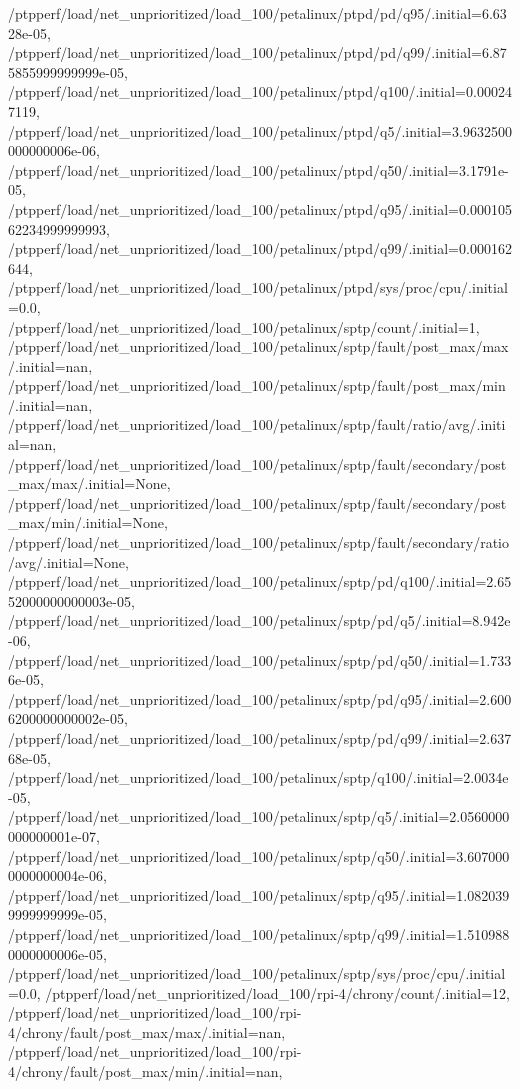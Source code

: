 {    /ptpperf/load/net_unprioritized/load_100/petalinux/ptpd/pd/q95/.initial=6.6328e-05,
    /ptpperf/load/net_unprioritized/load_100/petalinux/ptpd/pd/q99/.initial=6.875855999999999e-05,
    /ptpperf/load/net_unprioritized/load_100/petalinux/ptpd/q100/.initial=0.000247119,
    /ptpperf/load/net_unprioritized/load_100/petalinux/ptpd/q5/.initial=3.9632500000000006e-06,
    /ptpperf/load/net_unprioritized/load_100/petalinux/ptpd/q50/.initial=3.1791e-05,
    /ptpperf/load/net_unprioritized/load_100/petalinux/ptpd/q95/.initial=0.00010562234999999993,
    /ptpperf/load/net_unprioritized/load_100/petalinux/ptpd/q99/.initial=0.000162644,
    /ptpperf/load/net_unprioritized/load_100/petalinux/ptpd/sys/proc/cpu/.initial=0.0,
    /ptpperf/load/net_unprioritized/load_100/petalinux/sptp/count/.initial=1,
    /ptpperf/load/net_unprioritized/load_100/petalinux/sptp/fault/post_max/max/.initial=nan,
    /ptpperf/load/net_unprioritized/load_100/petalinux/sptp/fault/post_max/min/.initial=nan,
    /ptpperf/load/net_unprioritized/load_100/petalinux/sptp/fault/ratio/avg/.initial=nan,
    /ptpperf/load/net_unprioritized/load_100/petalinux/sptp/fault/secondary/post_max/max/.initial=None,
    /ptpperf/load/net_unprioritized/load_100/petalinux/sptp/fault/secondary/post_max/min/.initial=None,
    /ptpperf/load/net_unprioritized/load_100/petalinux/sptp/fault/secondary/ratio/avg/.initial=None,
    /ptpperf/load/net_unprioritized/load_100/petalinux/sptp/pd/q100/.initial=2.6552000000000003e-05,
    /ptpperf/load/net_unprioritized/load_100/petalinux/sptp/pd/q5/.initial=8.942e-06,
    /ptpperf/load/net_unprioritized/load_100/petalinux/sptp/pd/q50/.initial=1.7336e-05,
    /ptpperf/load/net_unprioritized/load_100/petalinux/sptp/pd/q95/.initial=2.6006200000000002e-05,
    /ptpperf/load/net_unprioritized/load_100/petalinux/sptp/pd/q99/.initial=2.63768e-05,
    /ptpperf/load/net_unprioritized/load_100/petalinux/sptp/q100/.initial=2.0034e-05,
    /ptpperf/load/net_unprioritized/load_100/petalinux/sptp/q5/.initial=2.0560000000000001e-07,
    /ptpperf/load/net_unprioritized/load_100/petalinux/sptp/q50/.initial=3.6070000000000004e-06,
    /ptpperf/load/net_unprioritized/load_100/petalinux/sptp/q95/.initial=1.0820399999999999e-05,
    /ptpperf/load/net_unprioritized/load_100/petalinux/sptp/q99/.initial=1.5109880000000006e-05,
    /ptpperf/load/net_unprioritized/load_100/petalinux/sptp/sys/proc/cpu/.initial=0.0,
    /ptpperf/load/net_unprioritized/load_100/rpi-4/chrony/count/.initial=12,
    /ptpperf/load/net_unprioritized/load_100/rpi-4/chrony/fault/post_max/max/.initial=nan,
    /ptpperf/load/net_unprioritized/load_100/rpi-4/chrony/fault/post_max/min/.initial=nan,
}
